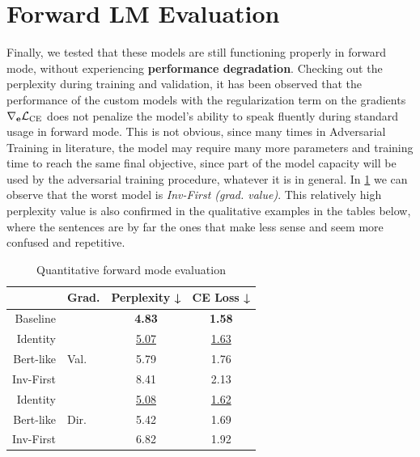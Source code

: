 \documentclass[../thesis.tex]{subfiles}
\begin{document}
\FloatBarrier{}
\section{Forward LM Evaluation}
Finally, we tested that these models are still functioning properly in forward mode, without experiencing \textbf{performance degradation}. Checking out the perplexity during training and validation, it has been observed that the performance of the custom models with the regularization term on the gradients $\nabla_{\mathbf{e}}\mathcal{L}_\text{CE}$ does not penalize the model's ability to speak fluently during standard usage in forward mode. This is not obvious, since many times in Adversarial Training in literature, the model may require many more parameters and training time to reach the same final objective, since part of the model capacity will be used by the adversarial training procedure, whatever it is in general.
In \cref{tab:inverse_lm__forward_mode_quantitative} we can observe that the worst model is \emph{Inv-First (grad. value)}.
This relatively high perplexity value is also confirmed in the qualitative examples in the tables below, where the sentences are by far the ones that make less sense and seem more confused and repetitive.


\begin{table}[htbp]
\vspace{0.5cm}
\centering
\begin{tabular}{rlcc}
\toprule
           & \textbf{Grad.} & \textbf{Perplexity ↓} & \textbf{CE Loss ↓} \\
\midrule
Baseline   &                & \textbf{4.83}         & \textbf{1.58}      \\
\midrule
Identity   &                & \underline{5.07}      & \underline{1.63}   \\
Bert-like  & Val.           & 5.79                  & 1.76               \\
Inv-First  &                & 8.41                  & 2.13               \\
\midrule
Identity   &                & \underline{5.08}      & \underline{1.62}   \\
Bert-like  & Dir.           & 5.42                  & 1.69               \\
Inv-First  &                & 6.82                  & 1.92               \\
\bottomrule
\end{tabular}
\vspace{0.25cm}
\caption{Quantitative forward mode evaluation}
\label{tab:inverse_lm__forward_mode_quantitative}
\end{table}
\end{document}
